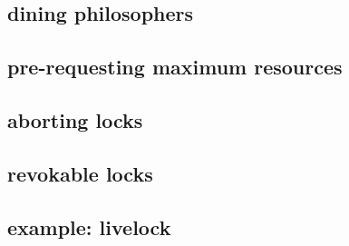 \subsection{dining philosophers}

\subsection{pre-requesting maximum resources}



\subsection{aborting locks}



\subsection{revokable locks}



\subsection{example: livelock}





